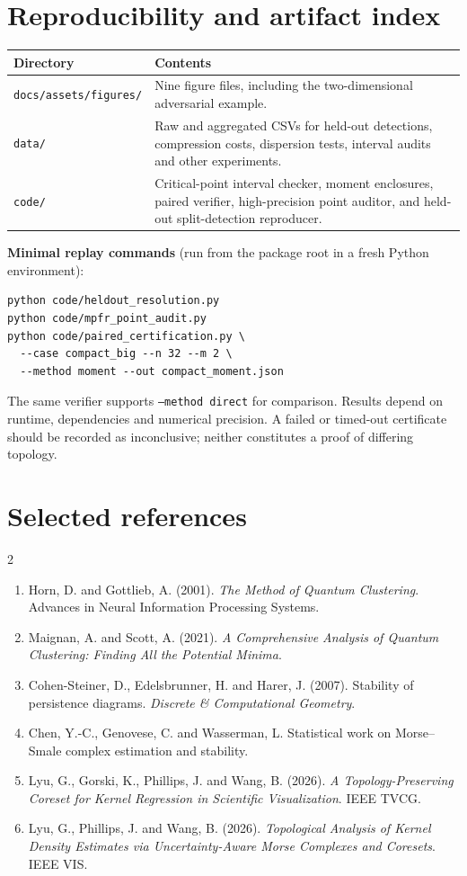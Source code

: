 \documentclass[10pt,a4paper]{article}
\begin{document}
\section*{Reproducibility and artifact index}
\begin{tabularx}{\linewidth}{@{}lX@{}}
\toprule
\textbf{Directory} & \textbf{Contents}\\\midrule
\texttt{docs/assets/figures/} & Nine figure files, including the two-dimensional adversarial example.\\
\texttt{data/} & Raw and aggregated CSVs for held-out detections, compression costs, dispersion tests, interval audits and other experiments.\\
\texttt{code/} & Critical-point interval checker, moment enclosures, paired verifier, high-precision point auditor, and held-out split-detection reproducer.\\\bottomrule
\end{tabularx}

\vspace{3mm}
\textbf{Minimal replay commands} (run from the package root in a fresh Python environment):
\begin{verbatim}
python code/heldout_resolution.py
python code/mpfr_point_audit.py
python code/paired_certification.py \
  --case compact_big --n 32 --m 2 \
  --method moment --out compact_moment.json
\end{verbatim}
The same verifier supports \texttt{--method direct} for comparison. Results depend on runtime, dependencies and numerical precision. A failed or timed-out certificate should be recorded as inconclusive; neither constitutes a proof of differing topology.

\section*{Selected references}
\begin{multicols}{2}\footnotesize
\begin{enumerate}[leftmargin=16pt,itemsep=3pt,topsep=2pt]
\item Horn, D. and Gottlieb, A. (2001). \emph{The Method of Quantum Clustering}. Advances in Neural Information Processing Systems.
\item Maignan, A. and Scott, A. (2021). \emph{A Comprehensive Analysis of Quantum Clustering: Finding All the Potential Minima}.
\item Cohen-Steiner, D., Edelsbrunner, H. and Harer, J. (2007). Stability of persistence diagrams. \emph{Discrete \& Computational Geometry}.
\item Chen, Y.-C., Genovese, C. and Wasserman, L. Statistical work on Morse--Smale complex estimation and stability.
\item Lyu, G., Gorski, K., Phillips, J. and Wang, B. (2026). \emph{A Topology-Preserving Coreset for Kernel Regression in Scientific Visualization}. IEEE TVCG.
\item Lyu, G., Phillips, J. and Wang, B. (2026). \emph{Topological Analysis of Kernel Density Estimates via Uncertainty-Aware Morse Complexes and Coresets}. IEEE VIS.
\end{enumerate}
\end{multicols}
\vspace{1mm}
\end{document}
